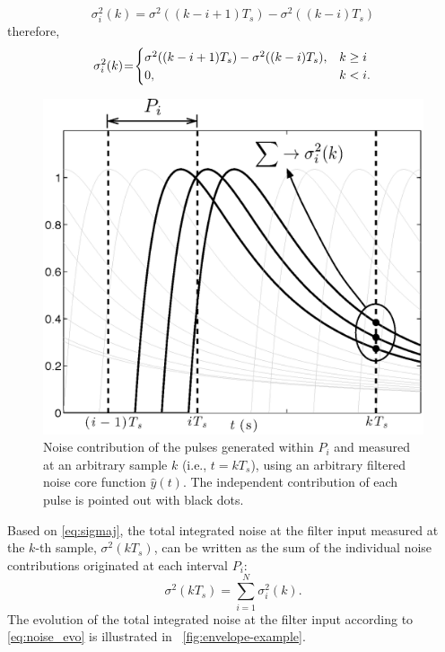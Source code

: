 \begin{equation}
		\sigma_i^2(k) = \sigma^2\left(\left(k-i+1\right)T_s\right)-\sigma^2\left(\left(k-i\right)T_s\right) 
		\label{eq:ap4}
\end{equation}
therefore,
\begin{equation}
  \sigma_i^2(k) \hspace{-0.2em}=\hspace{-0.2em} 
  \begin{cases}
     \sigma^2((k-i+1)T_s)-\sigma^2((k-i)T_s ), & k \geq i   \\
      0, &   k < i.
  \end{cases}\label{eq:sigmaj}
\end{equation}

\begin{figure}[!t]
	\centering
	\includegraphics[width=4.5in]{./Figures/sequence.eps}
	\caption[Noise contribution of the pulses generated within $P_i$.]{Noise contribution of the pulses generated within $P_i$ and measured at an arbitrary sample $k$ (i.e., $t=kT_s$), using an arbitrary filtered noise core function $\hat{y}(t)$. The independent contribution of each pulse is pointed out with black dots.}\label{fig:sequence}
\end{figure}

Based on \eqref{eq:sigmaj}, the total integrated noise at the filter input measured at the \mbox{$k$-th} sample, $\sigma^2(kT_s)$, can be written as the sum of the individual noise contributions originated at each interval $P_i$:
\begin{equation}
\sigma^2(kT_s) = \sum_{i=1}^{N} \sigma_i^2(k). \label{eq:noise_evo}
\end{equation}
The evolution of the total integrated noise at the filter input according to \eqref{eq:noise_evo} is illustrated in \figurename~\ref{fig:envelope-example}. 

